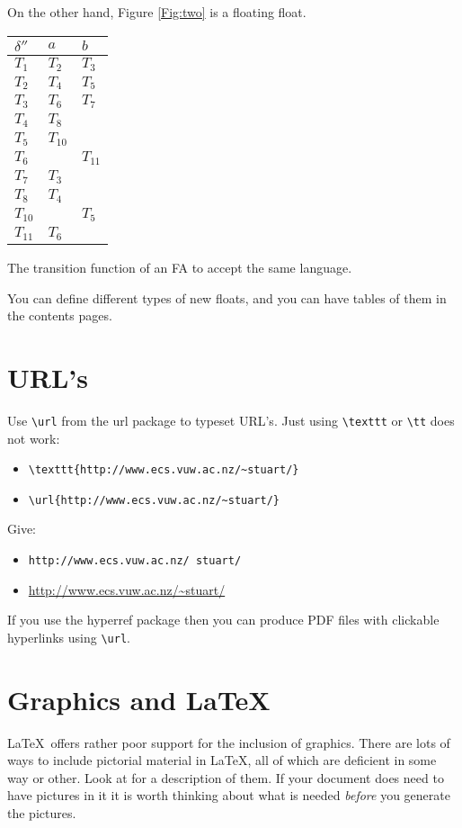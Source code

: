 On the other hand, Figure \ref{Fig:two} is a floating float. 



\begin{fig}[tbh]
\begin{center}
\begin{tabular}{l|ll}
$\delta''$ & $\mathit{a}$ & $\mathit{b}$ \\ \hline 
$T_{1}$  & $T_{2}$ & $T_{3}$\\ 
$T_{2}$  & $T_{4}$ & $T_{5}$\\ 
$T_{3}$  & $T_{6}$ & $T_{7}$\\ 
$T_{4}$  & $T_{8}$ & \\
$T_{5}$  & $T_{10}$ & \\
$T_{6}$  &  & $T_{11}$\\ 
$T_{7}$  & $T_{3}$ & \\
$T_{8}$  & $T_{4}$ & \\
$T_{10}$  &  & $T_{5}$\\ 
$T_{11}$  & $T_{6}$ & 
\end{tabular}
\caption{The transition function of an FA to accept 
the same language.}
\label{Fig:two}
\end{center}
\end{fig}

You can define different types of new floats, and you can have tables 
of them in the contents pages.


\section{URL's}
Use \verb=\url= from the \textsf{url} package to typeset URL's. Just 
using \verb+\texttt+ or \verb+\tt+ does not work:

\begin{itemize}
\item \verb+\texttt{http://www.ecs.vuw.ac.nz/~stuart/}+
\item \verb+\url{http://www.ecs.vuw.ac.nz/~stuart/}+
\end{itemize}

Give:
\begin{itemize}
\item \texttt{http://www.ecs.vuw.ac.nz/~stuart/}
\item \url{http://www.ecs.vuw.ac.nz/~stuart/}
\end{itemize}
If you use the \textsf{hyperref} package then you can produce PDF 
files with clickable hyperlinks using \verb=\url=.

\section{Graphics and \LaTeX}
\LaTeX\ offers rather poor support for the inclusion of graphics. 
There are lots of ways to include pictorial material in \LaTeX, all 
of which are deficient in some way or other. Look at \cite{GRM97GC} for a 
description of them. If your document does need to have pictures in it 
it is worth thinking about what is needed \emph{before} you generate 
the pictures.

